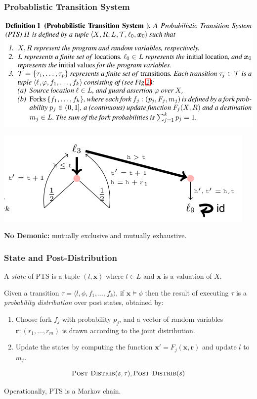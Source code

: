 \documentclass[11pt]{beamer}
\begin{document}
\begin{frame}\frametitle{Probablistic Transition System}
\begin{center}
\includegraphics[scale=0.35]{def1.png}

\includegraphics[scale=0.35]{def1exp.png}
\end{center}

\textbf{No Demonic:} mutually exclusive and mutually exhaustive.
\end{frame}

\begin{frame}\frametitle{State and Post-Distribution}

A \emph{state} of PTS is a tuple $(l,\mathbf{x})$ where $
l\in L$ and $\mathbf{x}$ is a valuation of $X$.

Given a transition $\tau = \langle l, \phi, f_1, \ldots, f_k\rangle $, if $\mathbf{x}\models \phi$ then the result of executing $\tau$ is a \emph{probability distribution} over post states, obtained by:

\begin{enumerate}
\item Choose fork $f_j$ with probability $p_j$, and a vector of random variables $\mathbf{r}:(r_1, \ldots, r_m)$ is drawn according to the joint distribution.


\item Update the states by computing the function $\mathbf{x}' = F_j(\mathbf{x}, \mathbf{r})$ and update $l$ to $m_j$. 
\end{enumerate}

\[
\textsc{Post-Distrib}(s,\tau), \textsc{Post-Distrib}(s)\]

Operationally, PTS is a Markov chain.
\end{frame}
\end{document}

